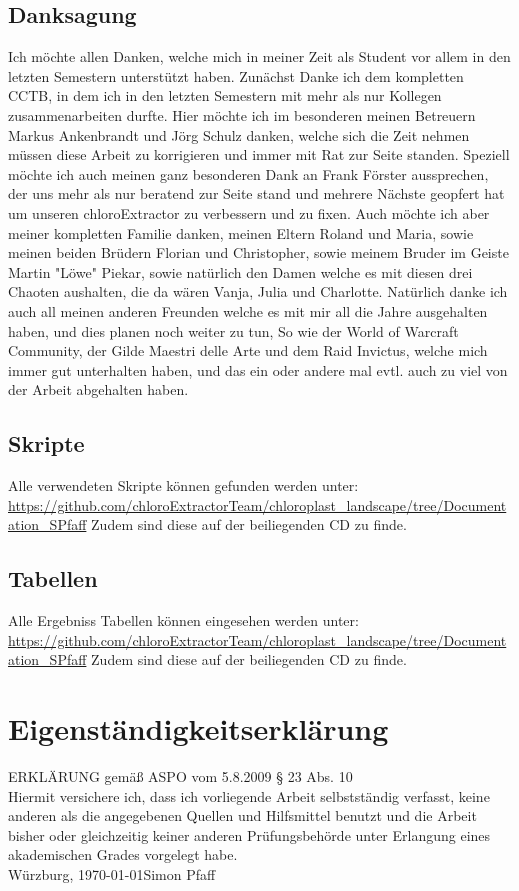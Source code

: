 \documentclass{scrartcl}
\begin{document}
\subsection{Danksagung}
\label{sec-7-1}
Ich möchte allen Danken, welche mich in meiner Zeit als Student vor allem in den letzten Semestern unterstützt haben.
Zunächst Danke ich dem kompletten CCTB, in dem ich in den letzten Semestern mit mehr als nur Kollegen zusammenarbeiten durfte.
Hier möchte ich im besonderen meinen Betreuern Markus Ankenbrandt und Jörg Schulz danken, welche sich die Zeit nehmen müssen diese 
Arbeit zu korrigieren und immer mit Rat zur Seite standen. Speziell möchte ich auch meinen ganz besonderen Dank an Frank Förster aussprechen, der uns mehr als nur beratend zur Seite stand und mehrere Nächste 
geopfert hat um unseren chloroExtractor zu verbessern und zu fixen. 
Auch möchte ich aber meiner kompletten Familie danken, meinen Eltern Roland und Maria, sowie meinen beiden Brüdern Florian und Christopher, sowie meinem Bruder im Geiste Martin "Löwe" Piekar, sowie natürlich den Damen
welche es mit diesen drei Chaoten aushalten, die da wären Vanja, Julia und Charlotte. Natürlich danke ich auch all meinen anderen Freunden welche es mit mir all die Jahre ausgehalten haben, und dies planen noch weiter zu tun,
So wie der World of Warcraft Community, der Gilde Maestri delle Arte und dem Raid Invictus, welche mich immer gut unterhalten haben, und das ein oder andere mal evtl. auch zu viel von der Arbeit abgehalten haben.



\subsection{Skripte}
\label{sec-7-2}
Alle verwendeten Skripte können gefunden werden unter:
\\
\url{https://github.com/chloroExtractorTeam/chloroplast_landscape/tree/Documentation_SPfaff}
Zudem sind diese auf der beiliegenden CD zu finde.
\subsection{Tabellen}
\label{sec-7-3}
Alle Ergebniss Tabellen können eingesehen werden unter: 
\\
\url{https://github.com/chloroExtractorTeam/chloroplast_landscape/tree/Documentation_SPfaff}
Zudem sind diese auf der beiliegenden CD zu finde.
\clearpage
\section*{Eigenständigkeitserklärung}
ERKLÄRUNG gemäß ASPO vom 5.8.2009 § 23 Abs. 10\\[10mm]
Hiermit versichere ich, dass ich vorliegende Arbeit selbstständig verfasst, keine anderen als
die angegebenen Quellen und Hilfsmittel benutzt und die Arbeit bisher oder gleichzeitig
keiner anderen Prüfungsbehörde unter Erlangung eines akademischen Grades
vorgelegt habe.\\[20mm]
Würzburg, \today \hfill Simon Pfaff
\clearpage
\end{document}

